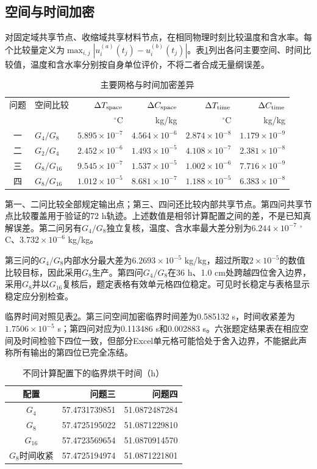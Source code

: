 \subsection{空间与时间加密}
对固定域共享节点、收缩域共享材料节点，在相同物理时刻比较温度和含水率。每个比较量定义为$\max_{i,j}|u^{(a)}_i(t_j)-u^{(b)}_i(t_j)|$。表\ref{tab_convergence}列出各问主要空间、时间比较值，温度和含水率分别按自身单位评价，不将二者合成无量纲误差。
\begin{table}[htbp]\centering\small
\caption{主要网格与时间加密差异}\label{tab_convergence}
\begin{tabular}{clrrrr}\toprule
问题 & 空间比较 & $\Delta T_{\rm space}$ & $\Delta C_{\rm space}$ & $\Delta T_{\rm time}$ & $\Delta C_{\rm time}$\\
 & & $^\circ$C & kg/kg & $^\circ$C & kg/kg\\\midrule
一 & $G_4/G_8$ & $5.895\!\times\!10^{-7}$ & $4.564\!\times\!10^{-6}$ & $2.874\!\times\!10^{-8}$ & $1.179\!\times\!10^{-9}$\\
二 & $G_2/G_4$ & $2.452\!\times\!10^{-6}$ & $1.493\!\times\!10^{-5}$ & $4.108\!\times\!10^{-7}$ & $2.381\!\times\!10^{-8}$\\
三 & $G_8/G_{16}$ & $9.545\!\times\!10^{-7}$ & $1.537\!\times\!10^{-5}$ & $1.002\!\times\!10^{-6}$ & $7.716\!\times\!10^{-9}$\\
四 & $G_8/G_{16}$ & $1.012\!\times\!10^{-5}$ & $8.681\!\times\!10^{-7}$ & $1.188\!\times\!10^{-5}$ & $6.383\!\times\!10^{-8}$\\\bottomrule
\end{tabular}
\end{table}
第一、二问比较全部规定输出点；第三、四问还比较内部共享节点。第四问共享节点比较覆盖用于验证的72 h轨迹。上述数值是相邻计算配置之间的差，不是已知真解误差。第二问另有$G_4/G_8$独立复核，温度、含水率最大差分别为$6.244\times10^{-7}$ $^\circ$C、$3.732\times10^{-6}$ kg/kg。

第三问的$G_4/G_8$内部水分最大差为$6.2693\times10^{-5}$ kg/kg，超过所取$2\times10^{-5}$的数值比较目标，因此采用$G_8$生产。第四问$G_4/G_8$在36 h、1.0 cm处跨越四位舍入边界，采用$G_8$并以$G_{16}$复核后，题定表格有效单元格四位稳定。可见时长稳定与表格显示稳定应分别检查。

临界时间对照见表\ref{tab_event_convergence}。第三问空间加密临界时间差为0.585132 s，时间收紧差为$1.7506\times10^{-5}$ s；第四问对应为0.113486 s和0.002883 s。六张题定结果表在相应空间及时间检验下四位一致，但部分Excel单元格可能恰处于舍入边界，不能据此声称所有输出的第四位已完全冻结。
\begin{table}[htbp]\centering\small
\caption{不同计算配置下的临界烘干时间（h）}\label{tab_event_convergence}
\begin{tabular}{crr}\toprule
配置 & 问题三 & 问题四\\\midrule
$G_4$ & 57.4731739851 & 51.0872487284\\
$G_8$ & 57.4725195022 & 51.0871229810\\
$G_{16}$ & 57.4723569654 & 51.0870914570\\
$G_8$时间收紧 & 57.4725194974 & 51.0871221801\\\bottomrule
\end{tabular}
\end{table}

